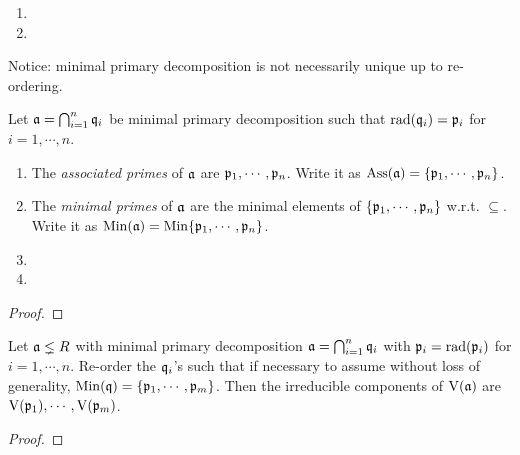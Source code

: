 \begin{example}
    \begin{enumerate}
        \item 
        \item 
    \end{enumerate}
\end{example}

\begin{remark}
    Notice: minimal primary decomposition is not necessarily unique up to re-ordering.
\end{remark}

\begin{definition}
    Let $\mathfrak{a} = \bigcap_{i=1}^{n} \mathfrak{q}_i$ be minimal primary decomposition such that $\operatorname{rad}(\mathfrak{q}_i) = \mathfrak{p}_i$ for $i = 1,\cdots,n$.
    \begin{enumerate}
        \item The \emph{associated primes} of $\mathfrak{a}$ are $\mathfrak{p}_1,\cdots,\mathfrak{p}_n$. Write it as $\operatorname{Ass}(\mathfrak{a}) = \{\mathfrak{p}_1,\cdots,\mathfrak{p}_n\}$.
        \item The \emph{minimal primes} of $\mathfrak{a}$ are the minimal elements of $\{\mathfrak{p}_1,\cdots,\mathfrak{p}_n\}$ w.r.t. $\subseteq$. Write it as $\operatorname{Min}(\mathfrak{a}) = \operatorname{Min}\{\mathfrak{p}_1,\cdots,\mathfrak{p}_n\}$.
        \item 
        \item 
    \end{enumerate}
\end{definition}

\begin{proposition}
\end{proposition}

\begin{proof}
\end{proof}

\begin{proposition}
    Let $\mathfrak{a} \lneq R$ with minimal primary decomposition $\mathfrak{a} = \bigcap_{i=1}^{n} \mathfrak{q}_i$ with $\mathfrak{p}_i = \operatorname{rad}(\mathfrak{p}_i)$ for $i = 1,\cdots,n$. Re-order the $\mathfrak{q}_i$'s such that if necessary to assume without loss of generality, $\operatorname{Min}(\mathfrak{q}) = \{\mathfrak{p}_1,\cdots,\mathfrak{p}_m\}$. Then the irreducible components of $\operatorname{V}(\mathfrak{a})$ are $\operatorname{V}(\mathfrak{p}_1),\cdots,\operatorname{V}(\mathfrak{p}_m)$.
\end{proposition}

\begin{proof}
\end{proof}

